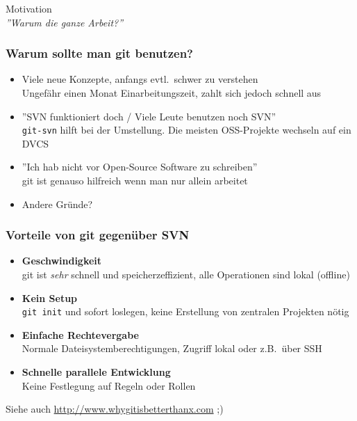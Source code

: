 \begin{frame}
  \begin{center}
  \Huge Motivation \\
  \small {\it ''Warum die ganze Arbeit?''}
  \end{center}
\end{frame}

\begin{frame}
  \frametitle{Warum sollte man git benutzen?}
  \begin{itemize}
    \pause
    \item Viele neue Konzepte, anfangs evtl.\ schwer zu verstehen \\ Ungefähr einen Monat Einarbeitungszeit, zahlt sich jedoch schnell aus
    \pause
    \item ''SVN funktioniert doch / Viele Leute benutzen noch SVN'' \\ {\tt git-svn} hilft bei der Umstellung. Die meisten OSS-Projekte wechseln auf ein DVCS
    \pause
    \item ''Ich hab nicht vor Open-Source Software zu schreiben'' \\ git ist genauso hilfreich wenn man nur allein arbeitet
    \pause
    \item Andere Gründe?
  \end{itemize}
\end{frame}

\begin{frame}
  \frametitle{Vorteile von git gegenüber SVN}
  \begin{itemize}
    \pause
    \item {\bf Geschwindigkeit} \\ git ist \emph{sehr} schnell und speicherzeffizient, alle Operationen sind lokal (offline)
    \pause
    \item {\bf Kein Setup} \\ {\tt git init} und sofort loslegen, keine Erstellung von zentralen Projekten nötig
    \pause
    \item {\bf Einfache Rechtevergabe} \\ Normale Dateisystemberechtigungen, Zugriff lokal oder z.B.\ über SSH
    \pause
    \item {\bf Schnelle parallele Entwicklung} \\ Keine Festlegung auf Regeln oder Rollen
  \end{itemize}
  Siehe auch \url{http://www.whygitisbetterthanx.com} ;)
\end{frame}

